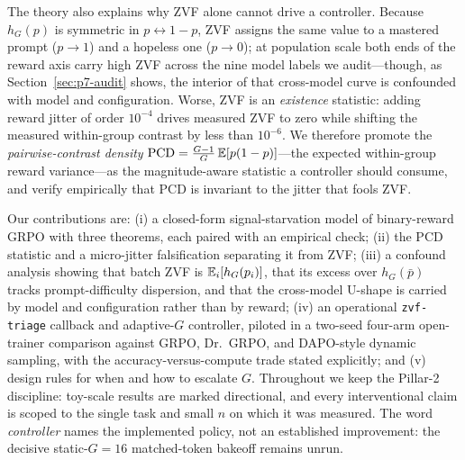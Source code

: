 The theory also explains why ZVF alone cannot drive a controller. Because
$h_G(p)$ is symmetric in $p \leftrightarrow 1-p$, ZVF assigns the same value
to a mastered prompt ($p \to 1$) and a hopeless one ($p \to 0$); at
population scale both ends of the reward axis carry high ZVF across the nine
model labels we audit---though, as Section~\ref{sec:p7-audit} shows, the
interior of that cross-model curve is confounded with model and configuration.
Worse, ZVF is an \emph{existence} statistic: adding reward jitter
of order $10^{-4}$ drives measured ZVF to zero while shifting the measured
within-group contrast by less than $10^{-6}$. We therefore promote the
\emph{pairwise-contrast density}
$\mathrm{PCD} = \frac{G-1}{G}\,\mathbb{E}[p(1-p)]$---the expected within-group reward
variance---as the magnitude-aware statistic a controller should consume, and
verify empirically that PCD is invariant to the jitter that fools ZVF.

Our contributions are:
(i) a closed-form signal-starvation model of binary-reward GRPO with three
theorems, each paired with an empirical check;
(ii) the PCD statistic and a micro-jitter falsification separating it from
ZVF;
(iii) a confound analysis showing that batch ZVF is $\mathbb{E}_i[h_G(p_i)]$, that
its excess over $h_G(\bar p)$ tracks prompt-difficulty dispersion, and that
the cross-model U-shape is carried by model and configuration rather than by
reward;
(iv) an operational \texttt{zvf-triage} callback and adaptive-$G$ controller,
piloted in a two-seed four-arm open-trainer comparison against GRPO,
Dr.~GRPO, and DAPO-style dynamic sampling, with the accuracy-versus-compute trade stated
explicitly; and
(v) design rules for when and how to escalate $G$.
Throughout we keep the Pillar-2 discipline: toy-scale results are marked
directional, and every interventional claim is scoped to the single task and
small $n$ on which it was measured. The word \emph{controller} names the
implemented policy, not an established improvement: the decisive
static-$G{=}16$ matched-token bakeoff remains unrun.

